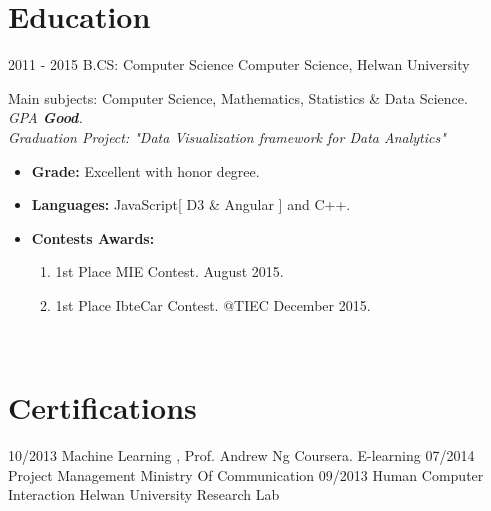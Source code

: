 \documentclass[]{friggeri-cv}
\begin{document}
\section{Education}
\begin{entrylist}
  \entry
    {2011 - 2015}
    {B.CS: Computer Science}
    {Computer Science, Helwan University}
    {
        Main subjects: Computer Science, Mathematics, Statistics \& Data Science.\\
        \emph{GPA  \textbf{Good}.}\\
        \emph{Graduation Project: "Data Visualization framework for Data Analytics"}
        \begin{itemize}
            \item \textbf{Grade:}    \hspace{3.6cm} Excellent with honor degree.
            \item \textbf{Languages:} \hspace{2.8cm} JavaScript[ D3 \& Angular ] and C++.
            \item \textbf{Contests Awards:} 
            \begin{enumerate}
                \item 1st Place MIE Contest. \hfill August 2015.
                \item 1st Place IbteCar Contest. \hspace {1cm} @TIEC \hfill December 2015.
             \end{enumerate}
        \end{itemize}
    }\\
    
\end{entrylist}

\section{Certifications}
\begin{entrylist}
  \entry
    {10/2013} {Machine Learning , Prof. Andrew Ng} {Coursera. E-learning} {}
  \entry
    {07/2014} {Project Management} {Ministry Of Communication} {}
  \entry
    {09/2013} {Human Computer Interaction} {Helwan University Research Lab} {}
\end{entrylist}

\newpage 
\end{document}
